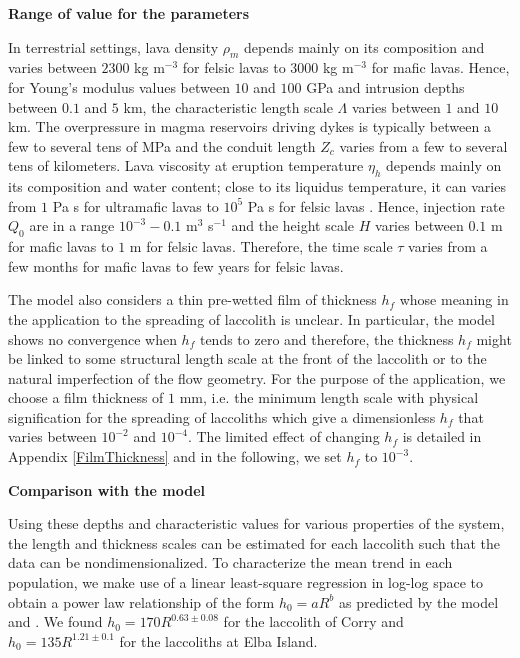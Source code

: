 \vspace{.5cm} \textbf{Range of value for the parameters} \vspace{.5cm}

In terrestrial settings,  lava density $\rho_m$ depends  mainly on its
composition and varies between $ 2300$ kg m$^{-3}$ for felsic lavas to
$3000$ kg m$^{-3}$ for mafic  lavas. Hence, for Young's modulus values
between $10$ and $100$ GPa and  intrusion depths between $0.1$ and $5$
km, the characteristic  length scale $\Lambda$ varies  between $1$ and
$10$  km.   The overpressure  in  magma  reservoirs driving  dykes  is
typically    between    a    few    to    several    tens    of    MPa
\citep{Tait:1988vn,Marti:2000fe} and  the conduit length  $Z_c$ varies
from a few  to several tens of kilometers. Lava  viscosity at eruption
temperature  $\eta_h$  depends mainly  on  its  composition and  water
content; close to its liquidus temperature,  it can varies from $1$ Pa
s  for   ultramafic  lavas   to  $10^{5}$  Pa   s  for   felsic  lavas
\citep{Anonymous:CZVBrBvv,Giordano:2008em,Whittington:2009fv,Chevrel:2013jn}.
Hence,  injection  rate  $Q_0$  are in  a  range  $10^{-3}-0.1$  m$^3$
s$^{-1}$ and  the height scale  $H$ varies  between $0.1$ m  for mafic
lavas to  $1$ m for  felsic lavas.   Therefore, the time  scale $\tau$
varies  from a  few months  for mafic  lavas to  few years  for felsic
lavas.

The model  also considers  a thin pre-wetted  film of  thickness $h_f$
whose  meaning in  the application  to the  spreading of  laccolith is
unclear.  In  particular, the  model shows  no convergence  when $h_f$
tends to zero \citep{Lister:2013ia} and therefore, the thickness $h_f$
might be  linked to some structural  length scale at the  front of the
laccolith or  to the natural  imperfection of the flow  geometry.  For
the purpose of the application, we  choose a film thickness of $1$ mm,
i.e.  the  minimum length  scale with  physical signification  for the
spreading of laccoliths  which give a dimensionless  $h_f$ that varies
between $10^{-2}$ and $10^{-4}$.  The limited effect of changing $h_f$
is detailed in  Appendix \ref{FilmThickness} and in  the following, we
set $h_f$ to $10^{-3}$.

\vspace{.5cm} \textbf{Comparison with the model} \vspace{.5cm}

Using these depths and characteristic values for various properties of
the system, the length and thickness  scales can be estimated for each
laccolith  such   that  the   data  can  be   nondimensionalized.   To
characterize  the mean  trend in  each population,  we make  use of  a
linear least-square regression in log-log  space to obtain a power law
relationship  of the  form $h_0=aR^b$  as predicted  by the  model and
\citet{McCaffrey:1997ea}.  We found $h_0=170 R^{0.63\pm 0.08}$ for the
laccolith of Corry and $h_0=135 R^{1.21\pm 0.1}$ for the laccoliths at
Elba Island.

